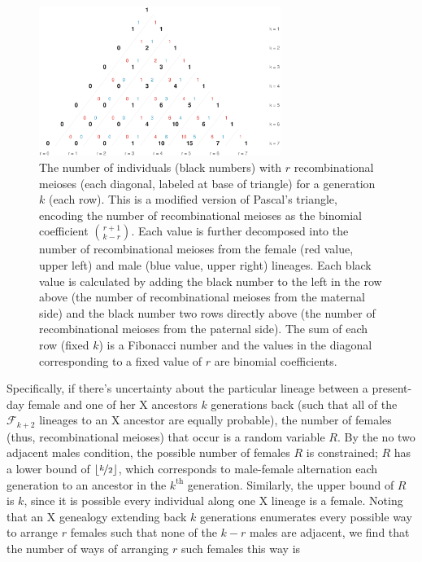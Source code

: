 \documentclass[11pt]{article}
\begin{document}
\begin{figure}[!ht]
  \centering
  \includegraphics[width=0.7\textwidth]{images/bifib}

  \caption{The number of individuals (black numbers) with $r$ recombinational
    meioses (each diagonal, labeled at base of triangle) for a generation $k$
    (each row). This is a modified version of Pascal's triangle, encoding the
    number of recombinational meioses as the binomial coefficient ${r + 1
    \choose k - r}$. Each value is further decomposed into the number of
    recombinational meioses from the female (red value, upper left) and male
    (blue value, upper right) lineages. Each black value is calculated by adding
    the black number to the left in the row above (the number of
    recombinational meioses from the maternal side) and the black number two
    rows directly above (the number of recombinational meioses from the
  paternal side). The sum of each row (fixed $k$) is a Fibonacci number and the
values in the diagonal corresponding to a fixed value of $r$ are binomial
coefficients.}

  \label{fig:pascals-bifib}

\end{figure}

Specifically, if there's uncertainty about the particular lineage between a
present-day female and one of her X ancestors $k$ generations back (such that
all of the $\mathcal{F}_{k+2}$ lineages to an X ancestor are equally probable),
the number of females (thus, recombinational meioses) that occur is a random
variable $R$. By the no two adjacent males condition, the possible number of
females $R$ is constrained; $R$ has a lower bound of $\lfloor \nicefrac{k}{2}
\rfloor$, which corresponds to male-female alternation each generation to an
ancestor in the $k^\text{th}$ generation. Similarly, the upper bound of $R$ is
$k$, since it is possible every individual along one X lineage is a female.
Noting that an X genealogy extending back $k$ generations enumerates every
possible way to arrange $r$ females such that none of the $k-r$ males are
adjacent, we find that the number of ways of arranging $r$ such females this
way is
\end{document}
